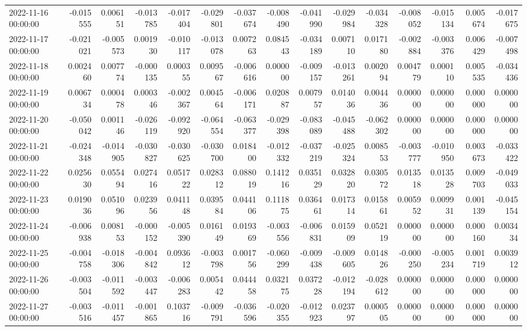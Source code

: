 \begin{tabular}{lrrrrrrrrrrrrrr}
2022-11-16 00:00:00 & -0.015555 & 0.006151 & -0.013785 & -0.017404 & -0.029801 & -0.037674 & -0.008490 & -0.041990 & -0.029984 & -0.034328 & -0.008052 & -0.015134 & 0.005674 & -0.017675 \\
2022-11-17 00:00:00 & -0.021021 & -0.005573 & 0.001930 & -0.010117 & -0.013078 & 0.007263 & 0.084543 & -0.034189 & 0.007110 & 0.017180 & -0.002884 & -0.003376 & 0.006429 & -0.007498 \\
2022-11-18 00:00:00 & 0.002460 & 0.007774 & -0.000135 & 0.000355 & 0.009567 & -0.006616 & 0.000000 & -0.009157 & -0.013261 & 0.002094 & 0.004779 & 0.000110 & 0.005535 & -0.034436 \\
2022-11-19 00:00:00 & 0.006734 & 0.000478 & 0.000346 & -0.002367 & 0.004564 & -0.006171 & 0.020887 & 0.007957 & 0.014036 & 0.004436 & 0.000000 & 0.000000 & 0.000000 & 0.000000 \\
2022-11-20 00:00:00 & -0.050042 & 0.001146 & -0.026119 & -0.092920 & -0.064554 & -0.063377 & -0.029398 & -0.083089 & -0.045488 & -0.062302 & 0.000000 & 0.000000 & 0.000000 & 0.000000 \\
2022-11-21 00:00:00 & -0.024348 & -0.014905 & -0.030827 & -0.030625 & -0.030700 & 0.018400 & -0.012332 & -0.037219 & -0.025324 & 0.008553 & -0.003777 & -0.010950 & 0.003673 & -0.033422 \\
2022-11-22 00:00:00 & 0.025630 & 0.055494 & 0.027416 & 0.051722 & 0.028312 & 0.088019 & 0.141216 & 0.035129 & 0.032820 & 0.030572 & 0.013518 & 0.013528 & 0.009703 & -0.049033 \\
2022-11-23 00:00:00 & 0.019036 & 0.051096 & 0.023956 & 0.041148 & 0.039584 & 0.044106 & 0.111875 & 0.036461 & 0.017314 & 0.015861 & 0.005952 & 0.009931 & 0.001139 & -0.045154 \\
2022-11-24 00:00:00 & -0.006938 & 0.008153 & -0.000152 & -0.005390 & 0.016149 & 0.019369 & -0.003556 & -0.006831 & 0.015909 & 0.052119 & 0.000000 & 0.000000 & 0.000160 & 0.003434 \\
2022-11-25 00:00:00 & -0.004758 & -0.018306 & -0.004842 & 0.093612 & -0.003798 & 0.001756 & -0.060299 & -0.009438 & -0.009605 & 0.014826 & -0.000250 & -0.005234 & 0.001719 & 0.003912 \\
2022-11-26 00:00:00 & -0.003504 & -0.011592 & -0.003447 & -0.006283 & 0.005442 & 0.044458 & 0.032175 & 0.037228 & -0.012194 & -0.028612 & 0.000000 & 0.000000 & 0.000000 & 0.000000 \\
2022-11-27 00:00:00 & -0.003516 & -0.011457 & -0.001865 & 0.103716 & -0.009791 & -0.036596 & -0.020355 & -0.012923 & 0.023797 & 0.000505 & 0.000000 & 0.000000 & 0.000000 & 0.000000 \\

\end{tabular}
